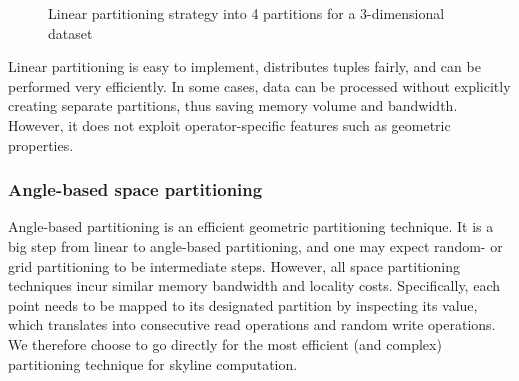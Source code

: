 \documentclass[12pt,a4paper,twoside]{report}
\begin{document}
\begin{figure}[H]
	\centering
	\usetikzlibrary{decorations.pathreplacing}
	\caption{Linear partitioning strategy into 4 partitions for a
	3-dimensional dataset} 
	\label{fig:linear-partitioning}
\end{figure}

Linear partitioning is easy to implement, distributes tuples
fairly, and can be performed very efficiently. In some cases, data
can be processed without explicitly creating separate partitions,
thus saving memory volume and bandwidth. However, it does not
exploit operator-specific features such as geometric properties.

\subsubsection{Angle-based space partitioning}

Angle-based partitioning  is an efficient geometric partitioning
technique. It is a big step from linear to angle-based partitioning,
and one may expect random- or grid partitioning to be intermediate
steps. However, all space partitioning techniques incur similar memory
bandwidth and locality costs. Specifically, each point needs to
be mapped to its designated partition by inspecting its value, which
translates into consecutive read operations and random write
operations. We therefore choose to go directly for the most efficient
(and complex) partitioning technique for skyline computation.
\end{document}
